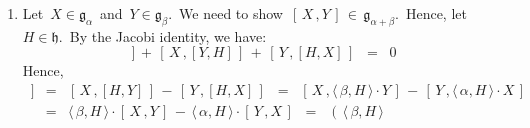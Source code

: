 \begin{enumerate}
    But,
    \,$
    \langle\,\alpha\,,H\,\rangle
    \,=\,
        \langle\,\alpha_{1}+\i\cdot\alpha_{2}\,,H\,\rangle
    \,=\,
        \langle\,\alpha_{1}\,,H\,\rangle
        \,+\,
        \i\cdot\langle\,\alpha_{2}\,,H\,\rangle
    $,\,
    with
    \,$\langle\,\alpha_{1}\,,H\,\rangle, \langle\,\alpha_{2}\,,H\,\rangle \in \Re$\,
    (\,since \,$\alpha_{1}, \alpha_{2}, H \in \mathfrak{t} \subset \mathfrak{k}$.\,)
    Thus, we see that
    \begin{equation*}
    \langle\,\alpha_{1}\,,H\,\rangle \,=\, 0\,,
    \quad
    \textnormal{for each \,$H \in \mathfrak{t}$}
    \end{equation*}
    Since \,$\mathfrak{h} \,=\, \mathfrak{t} + \i\cdot\mathfrak{t}$,\,
    it follows that we also have:
    \begin{equation*}
    \langle\,\alpha_{1}\,,H\,\rangle \,=\, 0\,,
    \quad
    \textnormal{for each \,$H \,\in\, \mathfrak{h} \,=\, \mathfrak{t} + \i\cdot\mathfrak{t}$}
    \end{equation*}
    So, we see that \,$\alpha_{1} \,\in\, \mathfrak{h}^{\perp}$.\,
    Now recall that we also have \,$\alpha_{1} \in \mathfrak{t} \subset \mathfrak{h}$.\,
    Thus, \,$\alpha_{1} \in \mathfrak{h} \cap \mathfrak{h}^{\perp} = \{\,0\,\}$.\,
    This establishes that \,$\alpha_{1} = 0$.\,
    We may now conclude that
    \,$
    \alpha
    \,=\,
        \alpha_{1} + \i\cdot\alpha_{2}
    \,=\,
        0 + \i\cdot\alpha_{2}
    \,=\,
        \i\cdot\alpha_{2}
    \,\in\,
        \i\cdot\mathfrak{t}
    $,\,
    as required.
\item
    Let \,$X \in \mathfrak{g}_{\alpha}$\, and \,$Y \in \mathfrak{g}_{\beta}$.\,
    We need to show \,$[\,X\,,Y\,] \,\in\, \mathfrak{g}_{\alpha+\beta}$.\,
    Hence, let \,$H \in \mathfrak{h}$.\, By the Jacobi identity, we have:
    \begin{equation*}
    [\,H\,,[X,Y]\,] \,+\, [\,X\,,[Y,H]\,] \,+\, [\,Y\,,[H,X]\,] \;\; = \;\; 0
    \end{equation*}
    Hence,
    \begin{eqnarray*}
    [\,H\,,[X,Y]\,]
    & = &
        [\,X\,,[H,Y]\,] \,-\, [\,Y\,,[H,X]\,]
    \;\; = \;\;
        [\,X\,,\langle\,\beta,H\,\rangle \cdot Y\,] \,-\, [\,Y\,,\langle\,\alpha,H\,\rangle \cdot X\,]
    \\
    & = &
        \langle\,\beta,H\,\rangle \cdot [\,X\,,Y\,] \,-\, \langle\,\alpha,H\,\rangle \cdot [\,Y\,, X\,]
    \;\; = \;\;
        \left(\,
            \langle\,\beta,H\,\rangle

\end{eqnarray*}
\end{enumerate}
